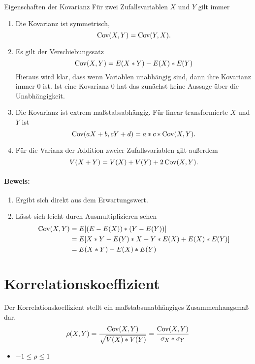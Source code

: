 \begin{satz}{Eigenschaften der Kovarianz}%
	Für zwei Zufallsvariablen $X$ und $Y$ gilt immer
	\begin{enumerate}%
		\item Die Kovarianz ist symmetrisch, 
		\begin{equation*}
			\operatorname{Cov}(X,Y)=\operatorname{Cov}(Y,X).
		\end{equation*}
		\item Es gilt der Verschiebungssatz
		\begin{equation*}
			\operatorname{Cov}(X,Y)=E(X*Y)-E(X)*E(Y)
		\end{equation*}
		Hieraus wird klar, dass wenn Variablen unabhängig sind, dann ihre Kovarianz immer $0$ ist. Ist eine Kovarianz $0$ hat das zunächst keine Aussage über die Unabhängigkeit.
		\item Die Kovarianz ist extrem maßstabsabhängig. Für linear transformierte $X$ und $Y$ ist
		\begin{equation*}
			\operatorname{Cov}(aX+b,cY+d)=a*c*\operatorname{Cov}(X,Y).
		\end{equation*}
		\item Für die Varianz der Addition zweier Zufallsvariablen gilt außerdem
		\begin{equation*}
			V(X+Y)=V(X)+V(Y)+2\operatorname{Cov}(X,Y).
		\end{equation*}
	\end{enumerate}
\end{satz}
\paragraph{Beweis:}
\begin{enumerate}
	\item Ergibt sich direkt aus dem Erwartungswert.
	\item Lässt sich leicht durch Ausmultiplizieren sehen
	\begin{align*}%
		\cov(X,Y)&=E[(E-E(X))*(Y-E(Y))]\\
		&=E[X*Y-E(Y)*X-Y*E(X)+E(X)*E(Y)]\\
		&=E(X*Y)-E(X)*E(Y)
	\end{align*}
\end{enumerate}

\section{Korrelationskoeffizient}
Der Korrelationskoeffizient stellt ein maßstabsunabhängiges Zusammenhangsmaß dar.
\begin{equation*}
	\rho(X,Y)=\frac{\operatorname{Cov}(X,Y)}{\sqrt{V(X)*V(Y)}}=\frac{\operatorname{Cov}(X,Y)}{\sigma_X*\sigma_Y}
\end{equation*}
\begin{itemize}
	\item $-1\leq\rho\leq1$
\end{itemize}